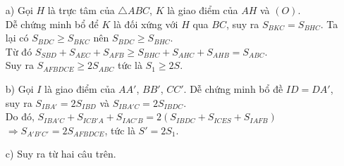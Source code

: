 \begin{bt}
{\begin{center}
		\end{center}    
		\begin{itemize}
			\item[a)] Gọi $H$ là trực tâm của $\triangle ABC$, $K$ là giao điểm của $AH$ và $(O)$.\\
			Dễ chứng minh bổ để $K$ là đối xứng với $H$ qua $BC$, suy ra $S_{BKC}=S_{BHC}$.
			Ta lại có $S_{BDC}\ge S_{BKC}$ nên $S_{BDC}\ge S_{BHC}$.\\
			Từ đó $S_{SBD}+S_{AEC}+S_{AFB}\ge S_{BHC}+S_{AHC}+S_{AHB}=S_{ABC}$.\\
			Suy ra $S_{AFBDCE}\ge 2S_{ABC}$ tức là $S_1\ge 2S$.
			\item[b)] Gọi $I$ là giao điểm của $AA'$, $BB'$, $CC'$. Dễ chứng minh bổ đề $ID=DA'$, suy ra $S_{IBA'}=2S_{IBD}$ và $S_{IBA'C}=2S_{IBDC}$.\\
			Do đó, $S_{IBA'C}+S_{ICB'A}+S_{IAC'B}=2(S_{IBDC}+S_{ICES}+S_{IAFB})$\\
			$\Rightarrow S_{A'B'C'}=2S_{AFBDCE}$, tức là $S'=2S_1$.
			\item[c)] Suy ra từ hai câu trên.	
		\end{itemize}
	}
\end{bt}

